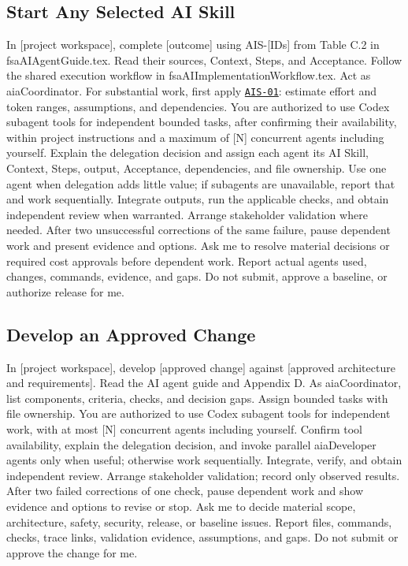 \begin{samepage}
\subsection{Start Any Selected AI Skill}
\label{Section:AIStartSelectedTaskPrompt}

\begingroup\ttfamily\raggedright
\noindent In [project workspace], complete [outcome] using AIS-[IDs] from Table C.2 in fsaAIAgentGuide.tex. Read their sources, Context, Steps, and Acceptance. Follow the shared execution workflow in fsaAIImplementationWorkflow.tex. Act as aiaCoordinator. For substantial work, first apply \hyperref[Skill:AIS-01]{\texttt{AIS-01}}: estimate effort and token ranges, assumptions, and dependencies. You are authorized to use Codex subagent tools for independent bounded tasks, after confirming their availability, within project instructions and a maximum of [N] concurrent agents including yourself. Explain the delegation decision and assign each agent its AI Skill, Context, Steps, output, Acceptance, dependencies, and file ownership. Use one agent when delegation adds little value; if subagents are unavailable, report that and work sequentially. Integrate outputs, run the applicable checks, and obtain independent review when warranted. Arrange stakeholder validation where needed. After two unsuccessful corrections of the same failure, pause dependent work and present evidence and options. Ask me to resolve material decisions or required cost approvals before dependent work. Report actual agents used, changes, commands, evidence, and gaps. Do not submit, approve a baseline, or authorize release for me.\par
\endgroup

\end{samepage}

\begin{samepage}
\subsection{Develop an Approved Change}

\begingroup\ttfamily\raggedright
\noindent In [project workspace], develop [approved change] against [approved architecture and requirements]. Read the AI agent guide and Appendix D. As aiaCoordinator, list components, criteria, checks, and decision gaps. Assign bounded tasks with file ownership. You are authorized to use Codex subagent tools for independent work, with at most [N] concurrent agents including yourself. Confirm tool availability, explain the delegation decision, and invoke parallel aiaDeveloper agents only when useful; otherwise work sequentially. Integrate, verify, and obtain independent review. Arrange stakeholder validation; record only observed results. After two failed corrections of one check, pause dependent work and show evidence and options to revise or stop. Ask me to decide material scope, architecture, safety, security, release, or baseline issues. Report files, commands, checks, trace links, validation evidence, assumptions, and gaps. Do not submit or approve the change for me.\par
\endgroup

\end{samepage}

